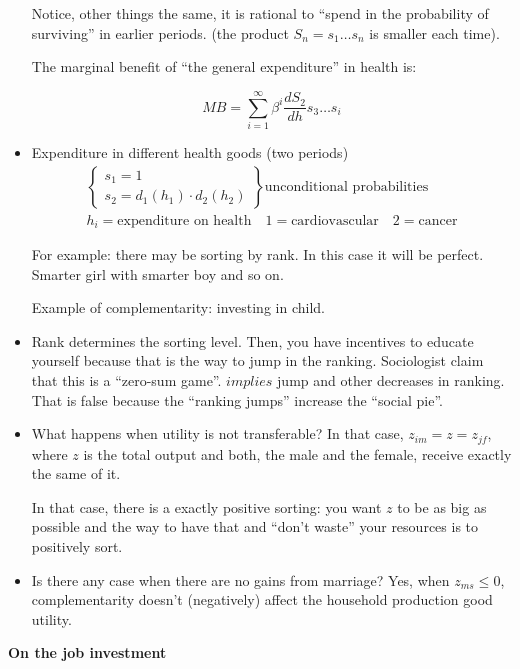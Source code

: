 \documentclass[14pt,notitlepage]{article}
\begin{document}
\begin{itemize}
Notice, other things the same, it is rational to ``spend in the probability of surviving'' in earlier periods. (the product $S_n = s_1 \dots s_n$ is smaller each time).

The marginal benefit of ``the general expenditure'' in health is:

\begin{equation*}
\boxed{MB = \sum \limits^{\infty}_{i=1} \beta^i \frac{dS_2}{dh} s_3 \dots s_i}
\end{equation*}

\item Expenditure in different health goods (two periods)
    \begin{align*}
    \left\{
    \begin{array}{l}
    s_1 = 1 \\
    s_2 = d_1(h_1) \cdot d_2(h_2)
    \end{array}
    \right\} \text{unconditional probabilities} \\
    h_i = \text{expenditure on health} \quad 1 = \text{cardiovascular} \quad 2 = \text{cancer}
    \end{align*}

For example: there may be sorting by rank. In this case it will be perfect. Smarter girl with smarter boy and so on.

Example of complementarity: investing in child.

\item Rank determines the sorting level. Then, you have incentives to educate yourself because that is the way to jump in the ranking.
    Sociologist claim that this is a ``zero-sum game''. $implies$ jump and other decreases in ranking. That is false because the ``ranking jumps'' increase the ``social pie''.
\item What happens when utility is not transferable?
    In that case, $z_{im} = z = z_{jf}$, where $z$ is the total output and both, the male and the female, receive exactly the same of it.

    In that case, there is a exactly positive sorting: you want $z$ to be as big as possible and the way to have that and ``don't waste'' your resources is to positively sort.
\item Is there any case when there are no gains from marriage?
    Yes, when $z_{ms} \leq 0$, complementarity doesn't (negatively) affect the household production good utility.
\end{itemize}

\textbf{On the job investment}
\end{document}
